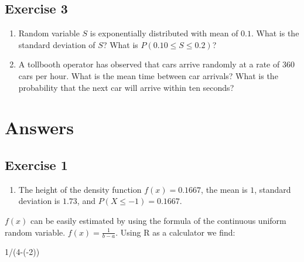 \documentclass[
  letterpaper,
  DIV=11,
  numbers=noendperiod]{scrreprt}
\newenvironment{Shaded}{\begin{snugshade}}{\end{snugshade}}
\newcommand{\DecValTok}[1]{\textcolor[rgb]{0.68,0.00,0.00}{#1}}
\newcommand{\NormalTok}[1]{\textcolor[rgb]{0.00,0.23,0.31}{#1}}
\newcommand{\SpecialCharTok}[1]{\textcolor[rgb]{0.37,0.37,0.37}{#1}}
\providecommand{\tightlist}{%
  \setlength{\itemsep}{0pt}\setlength{\parskip}{0pt}}\usepackage{longtable,booktabs,array}
\begin{document}
\hypertarget{exercise-3-18}{%
\subsection*{Exercise 3}\label{exercise-3-18}}

\begin{enumerate}
\def\labelenumi{\arabic{enumi}.}
\item
  Random variable \(S\) is exponentially distributed with mean of
  \(0.1\). What is the standard deviation of \(S\)? What is
  \(P(0.10 \leq S \leq 0.2)\)?
\item
  A tollbooth operator has observed that cars arrive randomly at a rate
  of \(360\) cars per hour. What is the mean time between car arrivals?
  What is the probability that the next car will arrive within ten
  seconds?
\end{enumerate}

\hypertarget{answers-9}{%
\section{Answers}\label{answers-9}}

\hypertarget{exercise-1-19}{%
\subsection*{Exercise 1}\label{exercise-1-19}}

\begin{blackbox}

\begin{enumerate}
\def\labelenumi{\arabic{enumi}.}
\tightlist
\item
  The height of the density function \(f(x)=0.1667\), the mean is \(1\),
  standard deviation is \(1.73\), and \(P(X \leq -1)=0.1667\).
\end{enumerate}

\end{blackbox}

\(f(x)\) can be easily estimated by using the formula of the continuous
uniform random variable. \(f(x)=\frac{1}{b-a}\). Using R as a calculator
we find:

\begin{Shaded}
\begin{Highlighting}[numbers=left,,]
\DecValTok{1}\SpecialCharTok{/}\NormalTok{(}\DecValTok{4}\SpecialCharTok{{-}}\NormalTok{(}\SpecialCharTok{{-}}\DecValTok{2}\NormalTok{))}
\end{Highlighting}
\end{Shaded}
\end{document}
